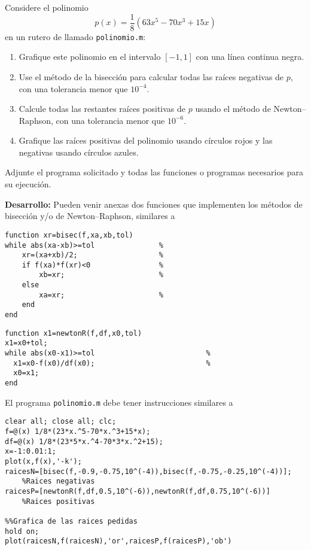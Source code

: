 
Considere el polinomio
$$
p(x)=\frac{1}{8}\left(63x^5-70x^3+15x\right)
$$
en un rutero de \matlab llamado \texttt{polinomio.m}:
\begin{enumerate}
\item Grafique este polinomio en el intervalo $[-1,1]$ con una l\'inea continua negra.
\item Use el m\'etodo de la bisecci\'on para calcular todas las ra\'ices negativas de $p$, con una tolerancia menor que $10^{-4}$.
\item Calcule todas las restantes ra\'ices positivas de $p$ usando el m\'etodo de Newton--Raphson, con una tolerancia menor que $10^{-6}$.
\item Grafique las ra\'ices  positivas del polinomio usando c\'irculos rojos y las negativas usando c\'irculos azules.
\end{enumerate}
Adjunte el programa solicitado y todas las funciones o programas necesarios para su ejecuci\'on.

\textbf{Desarrollo:} Pueden venir anexas dos funciones que implementen los m\'etodos de bisecci\'on y/o de Newton--Raphson, similares a
\begin{lstlisting}
function xr=bisec(f,xa,xb,tol)                                    
while abs(xa-xb)>=tol           	%
    xr=(xa+xb)/2;                   %
    if f(xa)*f(xr)<0                %
        xb=xr;                      %
    else
        xa=xr;                      %
    end
end
\end{lstlisting}

\begin{lstlisting}
function x1=newtonR(f,df,x0,tol)
x1=x0+tol;
while abs(x0-x1)>=tol                          %
  x1=x0-f(x0)/df(x0);                          %
  x0=x1;
end
\end{lstlisting}

El programa \texttt{polinomio.m} debe tener instrucciones similares a
\begin{lstlisting}
clear all; close all; clc;
f=@(x) 1/8*(23*x.^5-70*x.^3+15*x);
df=@(x) 1/8*(23*5*x.^4-70*3*x.^2+15);
x=-1:0.01:1;
plot(x,f(x),'-k');
raicesN=[bisec(f,-0.9,-0.75,10^(-4)),bisec(f,-0.75,-0.25,10^(-4))]; 
	%Raices negativas
raicesP=[newtonR(f,df,0.5,10^(-6)),newtonR(f,df,0.75,10^(-6))]
	%Raices positivas

%%Grafica de las raices pedidas
hold on;
plot(raicesN,f(raicesN),'or',raicesP,f(raicesP),'ob')
\end{lstlisting}